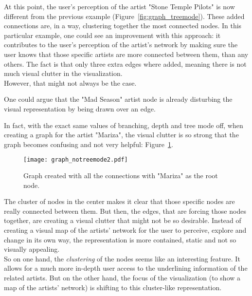       At this point, the user's perception of the artist "Stone Temple Pilots" is now different from the previous example (Figure~\ref{fig:graph_treemode}).
      These added connections are, in a way, clustering together the most connected nodes.
      In this particular example, one could see an improvement with this approach: it contributes to the user's perception of the artist's network by making sure the user knows that those specific artists are more connected between them, than any others.
      The fact is that only three extra edges where added, meaning there is not much visual clutter in the visualization. \\

      However, that might not always be the case.

      One could argue that the "Mad Season" artist node is already disturbing the visual representation by being drawn over an edge.

      In fact, with the exact same values of branching, depth and tree mode off, when creating a graph for the artist "Mariza", the visual clutter is so strong that the graph becomes confusing and not very helpful: Figure~\ref{fig:graph_notreemode2}.

      \begin{figure}[tb]
        \begin{center}
          \texttt{[image: graph\_notreemode2.pdf]}
        \end{center}
        \caption{Graph created with all the connections with "Mariza" as the root node.}
        \label{fig:graph_notreemode2}
      \end{figure}

      The cluster of nodes in the center makes it clear that those specific nodes are really connected between them. 
      But then, the edges, that are forcing those nodes together, are creating a visual clutter that might not be so desirable.
      Instead of creating a visual map of the artists' network for the user to perceive, explore and change in its own way, the representation is more contained, static and not so visually appealing.
      \hfill \\

      So on one hand, the \emph{clustering} of the nodes seems like an interesting feature.
      It allows for a much more in-depth user access to the underlining information of the related artists.
      But on the other hand, the focus of the visualization (to show a map of the artists' network) is shifting to this cluster-like representation.

